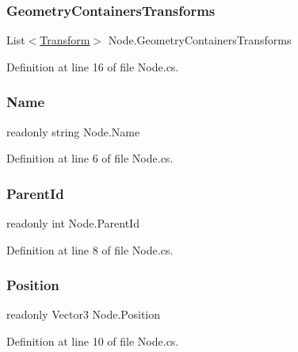 \subsubsection{\texorpdfstring{GeometryContainersTransforms}{GeometryContainersTransforms}}
{\footnotesize\ttfamily List$<$\mbox{\hyperlink{class_node_aa16042fa0253f5e0d97abdc5857363a6}{Transform}}$>$ Node.\+Geometry\+Containers\+Transforms}



Definition at line 16 of file Node.\+cs.

\mbox{\label{class_node_a3616974f5d2d3cb5103f3ecc6f839cf6}} 
\subsubsection{\texorpdfstring{Name}{Name}}
{\footnotesize\ttfamily readonly string Node.\+Name}



Definition at line 6 of file Node.\+cs.

\mbox{\label{class_node_a211f252da47c86c6395111473af56116}} 
\subsubsection{\texorpdfstring{ParentId}{ParentId}}
{\footnotesize\ttfamily readonly int Node.\+Parent\+Id}



Definition at line 8 of file Node.\+cs.

\mbox{\label{class_node_a4ab676883b2af5ab37f07c1d41dfe93e}} 
\subsubsection{\texorpdfstring{Position}{Position}}
{\footnotesize\ttfamily readonly Vector3 Node.\+Position}



Definition at line 10 of file Node.\+cs.

\mbox{\label{class_node_aa16042fa0253f5e0d97abdc5857363a6}} 
